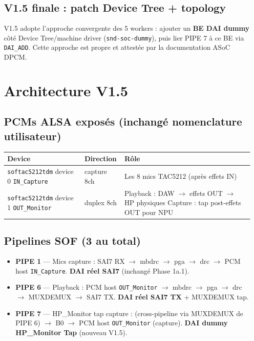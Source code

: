 \documentclass[11pt,a4paper]{article}
\begin{document}
\subsection{V1.5 finale : patch Device Tree + topology}

V1.5 adopte l'approche convergente des 5 workers : ajouter un \textbf{BE DAI dummy} côté Device Tree/machine driver (\texttt{snd-soc-dummy}), puis lier PIPE 7 à ce BE via \texttt{DAI\_ADD}. Cette approche est propre et attestée par la documentation ASoC DPCM.

\section{Architecture V1.5}

\subsection{PCMs ALSA exposés (inchangé nomenclature utilisateur)}

\begin{center}
\begin{tabularx}{\textwidth}{llX}
\toprule
\textbf{Device} & \textbf{Direction} & \textbf{Rôle} \\
\midrule
\texttt{softac5212tdm} device 0 \texttt{IN\_Capture} & capture 8ch & Les 8 mics TAC5212 (après effets IN) \\
\texttt{softac5212tdm} device 1 \texttt{OUT\_Monitor} & duplex 8ch & Playback : DAW $\to$ effets OUT $\to$ HP physiques \newline Capture : tap post-effets OUT pour NPU \\
\bottomrule
\end{tabularx}
\end{center}

\subsection{Pipelines SOF (3 au total)}

\begin{itemize}[leftmargin=*, itemsep=1pt]
  \item \textbf{PIPE 1} — Mics capture : SAI7 RX $\to$ mbdrc $\to$ pga $\to$ drc $\to$ PCM host \texttt{IN\_Capture}. \textbf{DAI réel SAI7} (inchangé Phase 1a.1).
  \item \textbf{PIPE 6} — Playback : PCM host \texttt{OUT\_Monitor} $\to$ mbdrc $\to$ pga $\to$ drc $\to$ MUXDEMUX $\to$ SAI7 TX. \textbf{DAI réel SAI7 TX} + MUXDEMUX tap.
  \item \textbf{PIPE 7} — HP\_Monitor tap capture : (cross-pipeline via MUXDEMUX de PIPE 6) $\to$ B0 $\to$ PCM host \texttt{OUT\_Monitor} (capture). \textbf{DAI dummy HP\_Monitor Tap} (nouveau V1.5).
\end{itemize}
\end{document}
